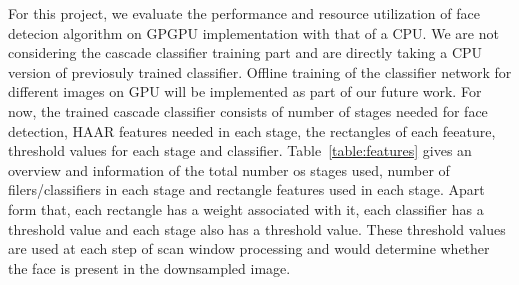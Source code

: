 For this project, we evaluate the performance and resource utilization 
of face detecion algorithm on GPGPU implementation with that of a CPU. 
We are not considering the
cascade classifier training part and are directly taking a CPU version of
previosuly trained classifier. Offline training of the classifier network
for different images on GPU will be implemented as part of our future work.
For now, the trained cascade classifier consists of 
number of stages needed for face detection, HAAR features needed in each
stage, the rectangles of each feeature, threshold values for each stage and classifier.
Table~\ref{table:features} gives an overview and information of the total number os stages
used, number of filers/classifiers in each stage and rectangle features used in each stage.
Apart form that, each rectangle has a weight associated with it, each classifier has a threshold value and each stage
also has a threshold value. These threshold values are used at each step of scan window processing
and would determine whether the face is present in the downsampled image. 

